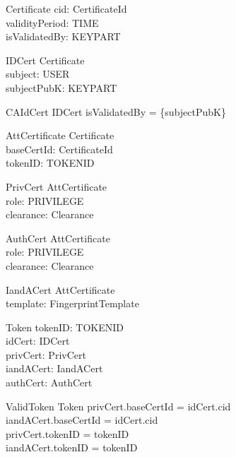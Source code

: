 \begin{schema}{Certificate}
  cid: CertificateId\\
  validityPeriod: \power  TIME\\
  isValidatedBy: \Optional KEYPART
\end{schema}

\begin{schema}{IDCert}
  Certificate\\
  subject: USER\\
  subjectPubK: KEYPART
\end{schema}

\begin{schema}{CAIdCert}
  IDCert
\where
  isValidatedBy = \{subjectPubK\}
\end{schema}

\begin{zed}
  [TOKENID]
\end{zed}

\begin{schema}{AttCertificate}
  Certificate\\
  baseCertId: CertificateId\\
  tokenID: TOKENID
\end{schema}

\begin{schema}{PrivCert}
  AttCertificate\\
  role: PRIVILEGE\\
  clearance: Clearance
\end{schema}

\begin{schema}{AuthCert}
  AttCertificate\\
  role: PRIVILEGE\\
  clearance: Clearance
\end{schema}

\begin{schema}{IandACert}
  AttCertificate\\
  template: FingerprintTemplate
\end{schema}

\begin{schema}{Token}
  tokenID: TOKENID\\
  idCert: IDCert\\
  privCert: PrivCert\\
  iandACert: IandACert\\
  authCert: \Optional AuthCert
\end{schema}

\begin{schema}{ValidToken}
  Token
\where
  privCert.baseCertId = idCert.cid\\
  iandACert.baseCertId = idCert.cid\\
  privCert.tokenID = tokenID\\
  iandACert.tokenID = tokenID
\end{schema}

